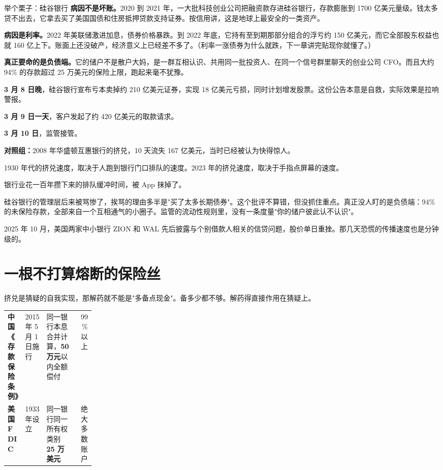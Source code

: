\begin{egbox}{举个栗子：硅谷银行}
\textbf{病因不是坏账。}2020 到 2021 年，一大批科技创业公司把融资款存进硅谷银行，存款膨胀到 1700 亿美元量级。钱太多贷不出去，它拿去买了美国国债和住房抵押贷款支持证券。按信用讲，这是地球上最安全的一类资产。

\textbf{病因是利率。}2022 年美联储激进加息，债券价格暴跌。到 2022 年底，它持有至到期那部分组合的浮亏约 150 亿美元，而它全部股东权益也就 160 亿上下。账面上还没破产，经济意义上已经差不多了。（利率一涨债券为什么就跌，下一章讲完贴现你就懂了。）

\textbf{真正要命的是负债端。}它的储户不是散户大妈，是一群互相认识、共用同一批投资人、在同一个信号群里聊天的创业公司 CFO。而且大约 94\% 的存款超过 25 万美元的保险上限，跑起来毫不犹豫。

\textbf{3 月 8 日晚}，硅谷银行宣布亏本卖掉约 210 亿美元证券，实现 18 亿美元亏损，同时计划增发股票。这份公告本意是自救，实际效果是拉响警报。

\textbf{3 月 9 日一天}，客户发起了约 420 亿美元的取款请求。

\textbf{3 月 10 日}，监管接管。

\textbf{对照组：}2008 年华盛顿互惠银行的挤兑，10 天流失 167 亿美元，当时已经被认为快得惊人。

\end{egbox}

1930 年代的挤兑速度，取决于人跑到银行门口排队的速度。2023 年的挤兑速度，取决于手指点屏幕的速度。

银行业花一百年攒下来的排队缓冲时间，被 App 抹掉了。

硅谷银行的管理层后来被骂惨了，挨骂的理由多半是"买了太多长期债券"。这个批评不算错，但没抓住重点。真正没人盯的是负债端：94\% 的未保险存款，全部来自一个互相通气的小圈子。监管的流动性规则里，没有一条度量"你的储户彼此认不认识"。

2025 年 10 月，美国两家中小银行 ZION 和 WAL 先后披露与个别借款人相关的信贷问题，股价单日重挫。那几天恐慌的传播速度也是分钟级的。

\section{一根不打算熔断的保险丝}

挤兑是猜疑的自我实现，那解药就不能是"多备点现金"。备多少都不够。解药得直接作用在猜疑上。

\begin{tablewrap}
\begin{xltabular}{\linewidth}{>{\raggedright\arraybackslash}p{0.20\linewidth}XXr}
\toprule
{} &  &  &  \\
\midrule
\textbf{中国《存款保险条例》} & 2015 年 5 月 1 日施行 & 同一银行本息合并计算，\textbf{50 万元}以内全额偿付 & 99\% 以上 \\
\textbf{美国 FDIC} & 1933 年设立 & 同一银行同一所有权类别 \textbf{25 万美元} & 绝大多数账户 \\
\bottomrule
\end{xltabular}
\end{tablewrap}

